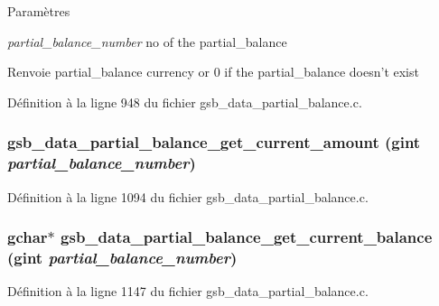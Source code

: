 \begin{DoxyParams}{Paramètres}
\item[{\em partial\_\-balance\_\-number}]no of the partial\_\-balance\end{DoxyParams}
\begin{DoxyReturn}{Renvoie}
partial\_\-balance currency or 0 if the partial\_\-balance doesn't exist 
\end{DoxyReturn}


Définition à la ligne 948 du fichier gsb\_\-data\_\-partial\_\-balance.c.

\subsubsection[{gsb\_\-data\_\-partial\_\-balance\_\-get\_\-current\_\-amount}]{ gsb\_\-data\_\-partial\_\-balance\_\-get\_\-current\_\-amount (gint {\em partial\_\-balance\_\-number})}\label{gsb__data__partial__balance_8h_a3b93643dcaf37d9037bd7c62d244a0d1}


Définition à la ligne 1094 du fichier gsb\_\-data\_\-partial\_\-balance.c.

\subsubsection[{gsb\_\-data\_\-partial\_\-balance\_\-get\_\-current\_\-balance}]{\setlength{\rightskip}{0pt plus 5cm}gchar$\ast$ gsb\_\-data\_\-partial\_\-balance\_\-get\_\-current\_\-balance (gint {\em partial\_\-balance\_\-number})}\label{gsb__data__partial__balance_8h_aa499f52edc2425fcf0ab8c87235e5f33}


Définition à la ligne 1147 du fichier gsb\_\-data\_\-partial\_\-balance.c.


